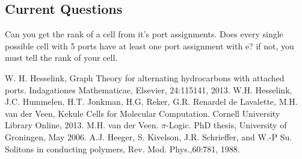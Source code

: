 \documentclass[12pt]{article}
\begin{document}
\subsection{Current Questions}

Can you get the rank of a cell from it's port assignments. Does every single possible cell with 5 ports have at least one port assignment with e? if not, you must tell the rank of your cell.


\begin{thebibliography}{abrv}

 W. H. Hesselink, Graph Theory for alternating hydrocarbons with attached ports. Indagationes Mathematicae, Elsevier, 24:115141, 2013.
 W.H. Hesselink, J.C. Hummelen, H.T. Jonkman, H.G. Reker, G.R. Renardel de Lavalette, M.H. van der Veen, Kekule Cells for Molecular Computation. Cornell University Library Online, 2013.
 M.H. van der Veen. $\pi$-Logic. PhD thesis, University of Groningen, May 2006.
 A.J. Heeger, S. Kivelson, J.R. Schrieffer, and W.-P Su. Solitons in conducting polymers, Rev. Mod. Phys.,60:781, 1988.

\end{thebibliography}
\end{document}
